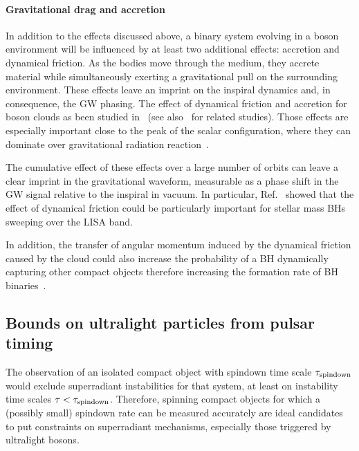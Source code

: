 \documentclass[11pt]{article}
\numberwithin{equation}{section} %
\begin{document}
\paragraph{Gravitational drag and accretion} 
In addition to the effects discussed above, a binary system evolving in a boson environment will  be influenced by at least two additional effects: accretion and dynamical friction. As the bodies move through the medium, they accrete material while simultaneously exerting a gravitational pull on the surrounding environment. These effects leave an imprint on the inspiral dynamics and, in consequence, the GW phasing. The effect of dynamical friction and accretion for boson clouds as been studied in~\cite{Ferreira:2017pth,Zhang:2019eid} (see also~\cite{Macedo:2013qea} for related studies). Those effects are especially important close to the peak of the scalar configuration, where they can dominate over gravitational radiation reaction~\cite{Zhang:2019eid}.

The cumulative effect of these effects over a large number of orbits can leave a clear imprint in the gravitational waveform, measurable as a phase shift in the GW signal relative to the inspiral in vacuum. In particular, Ref.~\cite{Zhang:2019eid} showed that the effect of dynamical friction could be particularly important for stellar mass BHs sweeping over the LISA band. 

In addition, the transfer of angular momentum induced by the dynamical friction caused by the cloud could also increase 
the probability of a BH dynamically capturing other compact objects therefore increasing the formation rate of BH 
binaries~\cite{Zhang:2019eid}.



\subsection{Bounds on ultralight particles from pulsar timing}\label{sec:bounds_pulsar}
%
The observation of an isolated compact object with spindown time scale $\tau_{\rm spindown}$ would exclude superradiant instabilities for that system, at least on instability time scales $\tau<\tau_{\rm spindown}$. Therefore, spinning compact objects for which a (possibly small) spindown rate can be measured accurately are ideal candidates to put constraints on superradiant mechanisms, especially those triggered by ultralight bosons.
\end{document}
